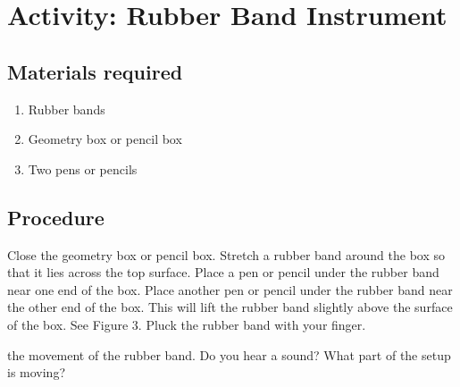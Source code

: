 \section{Activity: Rubber Band Instrument}
\subsection{Materials required}
\begin{enumerate}
\item Rubber bands
\item Geometry box or pencil box
\item Two pens or pencils
\end{enumerate}
\subsection{Procedure}
Close the geometry box or pencil box. Stretch a rubber band around the box so that it lies across the top surface. Place a pen or pencil under the rubber band near one end of the box. Place another pen or pencil under the rubber band near the other end of the box. This will lift the rubber band slightly above the surface of the box. See Figure 3. Pluck the rubber band with your finger.
\begin{marginfigure}
  \centering
{}
  \caption{\label{rubberbox}Pencil box with rubber band around it.}
\end{marginfigure}
 the movement of the rubber band. Do you hear a sound? What part of the setup is moving?